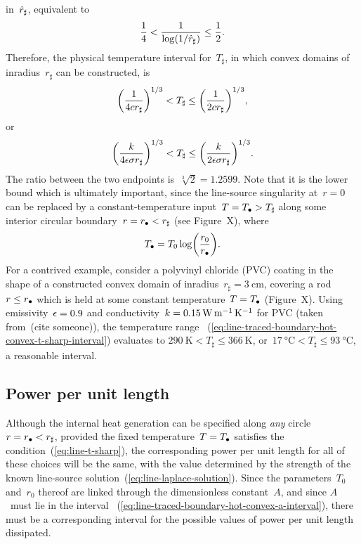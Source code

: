 in~$\hat{r}_\sharp$,
equivalent to
\begin{equation}
  \frac{1}{4} < \frac{1}{\log (1 / \hat{r}_\sharp)} \le \frac{1}{2}.
  \label{eq:line-traced-boundary-hot-convex-log-r-sharp-interval}
\end{equation}
Therefore, the physical temperature interval for~$T_\sharp$,
in which convex domains of inradius~$r_\sharp$ can be constructed,
is
\[
  \roundbr*{\frac{1}{4 c r_\sharp}}^{1/3}
    <
  T_\sharp
    \le
  \roundbr*{\frac{1}{2 c r_\sharp}}^{1/3},
\]
or
\begin{equation}
  \roundbr*{\frac{\conduc}{4 \emiss \stefan r_\sharp}}^{1/3}
    <
  T_\sharp
    \le
  \roundbr*{\frac{\conduc}{2 \emiss \stefan r_\sharp}}^{1/3}.
  \label{eq:line-traced-boundary-hot-convex-t-sharp-interval}
\end{equation}
The ratio between the two endpoints is~$\sqrt[3]{2} = 1.2599$.
Note that it is the lower bound which is ultimately important,
since the line-source singularity at~$r = 0$
can be replaced by a constant-temperature input~$T = T_\bullet > T_\sharp$
along some interior circular boundary~$r = r_\bullet < r_\sharp$
(see Figure~X), %
where
\begin{equation}
  T_\bath = T_0 \log \roundbr*{\frac{r_0}{r_\bath}}.
  \label{eq:line-equivalent-dirichlet-relation}
\end{equation}
For a contrived example,
consider a polyvinyl chloride (PVC) coating
in the shape of a constructed convex domain
of inradius~$r_\sharp = \SI{3}{\centi\metre}$,
covering a rod~$r \le r_\bullet$
which is held at some constant temperature~$T = T_\bullet$
(Figure~X). %
Using emissivity~$\epsilon = 0.9$
and conductivity~$k = \SI{0.15}{\watt \per\metre \per\kelvin}$
for PVC (taken from~(cite someone)), %
the temperature range~%
  (\ref{eq:line-traced-boundary-hot-convex-t-sharp-interval})
evaluates to $\SI{290}{\kelvin} < T_\sharp \le \SI{366}{\kelvin}$,
or~$\SI{17}{\degreeCelsius} < T_\sharp \le \SI{93}{\degreeCelsius}$,
a reasonable interval.

\subsection{Power per unit length}
\label{sec:line.physical.power}

Although the internal heat generation can be specified
along \emph{any} circle~$r = r_\bullet < r_\sharp$,
provided the fixed temperature~$T = T_\bullet$
satisfies the condition~(\ref{eq:line-t-sharp}),
the corresponding power per unit length
for all of these choices will be the same,
with the value determined by the strength
of the known line-source solution~(\ref{eq:line-laplace-solution}).
Since the parameters~$T_0$ and~$r_0$ thereof are linked
through the dimensionless constant~$A$,
and since $A$~must lie in the interval~%
  (\ref{eq:line-traced-boundary-hot-convex-a-interval}),
there must be a corresponding interval for the possible values of
power per unit length dissipated.

